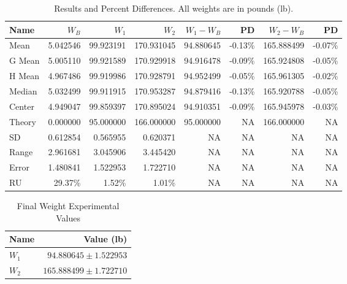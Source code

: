 \begin{table}
    \centering
    \begin{tabular}{|l|r|r|r|r|r|r|r|}
        \hline
        \textbf{Name} & $W_{B}$ & $W_{1}$ & $W_{2}$ & $W_{1} - W_{B}$ & \textbf{PD} & $W_{2} - W_{B}$ & \textbf{PD} \\
        \hline
        Mean & 5.042546 & 99.923191 & 170.931045 & 94.880645 & -0.13\% & 165.888499 & -0.07\% \\
        G Mean & 5.005110 & 99.921589 & 170.929918 & 94.916478 & -0.09\% & 165.924808 & -0.05\% \\
        H Mean & 4.967486 & 99.919986 & 170.928791 & 94.952499 & -0.05\% & 165.961305 & -0.02\% \\
        Median & 5.032499 & 99.911915 & 170.953287 & 94.879416 & -0.13\% & 165.920788 & -0.05\% \\
        Center & 4.949047 & 99.859397 & 170.895024 & 94.910351 & -0.09\% & 165.945978 & -0.03\% \\
        \hline
        Theory & 0.000000 & 95.000000 & 166.000000 & 95.000000 & NA & 166.000000 & NA \\
        \hline
        SD & 0.612854 & 0.565955 & 0.620371 & NA & NA & NA & NA \\
        Range & 2.961681 & 3.045906 & 3.445420 & NA & NA & NA & NA \\
        Error & 1.480841 & 1.522953 & 1.722710 & NA & NA & NA & NA \\
        RU & 29.37\% & 1.52\% & 1.01\% & NA & NA & NA & NA \\
        \hline
    \end{tabular}
    \caption{Results and Percent Differences. All weights are in pounds (lb).}
    \label{table:00.results}
\end{table}
\begin{table}
    \centering
    \begin{tabular}{|l|r|}
        \hline
        \textbf{Name} & \textbf{Value (lb)} \\
        \hline
        $W_{1}$ & $94.880645 \pm 1.522953$ \\
        $W_{2}$ & $165.888499 \pm 1.722710$ \\
        \hline
    \end{tabular}
    \caption{Final Weight Experimental Values}
    \label{table:00.final}
\end{table}
